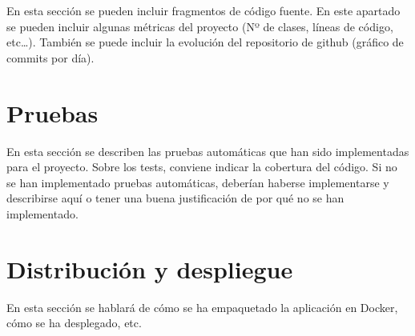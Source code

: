 En esta sección se pueden incluir fragmentos de código fuente. En este apartado se pueden incluir algunas métricas del proyecto (Nº de clases, líneas de código, etc…). También se puede incluir la evolución del repositorio de github (gráfico de commits por día).

\section{Pruebas} 

En esta sección se describen las pruebas automáticas que han sido implementadas para el proyecto. Sobre los tests, conviene indicar la cobertura del código. Si no se han implementado pruebas automáticas, deberían haberse implementarse y describirse aquí o tener una buena justificación de por qué no se han implementado.

\section{Distribución y despliegue} 

En esta sección se hablará de cómo se ha empaquetado la aplicación en Docker, cómo se ha desplegado, etc.
